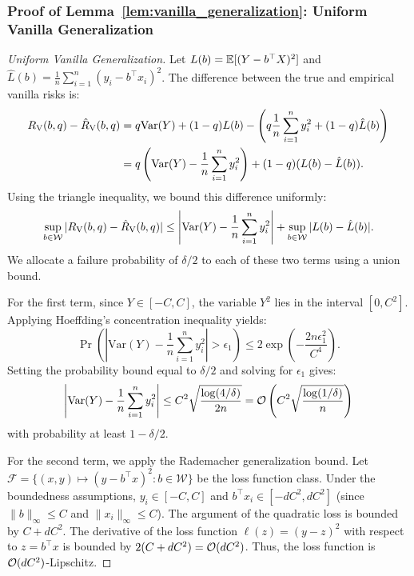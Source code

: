 \subsubsection*{Proof of Lemma~\ref{lem:vanilla_generalization}: Uniform Vanilla Generalization}
\label{app:proof_vanilla_generalization}
\begin{proof}[Uniform Vanilla Generalization]
Let $L(b) = \mathbb{E}[(Y - b^\top X)^2]$ and $\hat{L}(b) = \frac{1}{n}\sum_{i=1}^n (y_i - b^\top x_i)^2$. The difference between the true and empirical vanilla risks is:
\begin{align}
    R_{\mathrm{V}}(b, q) - \hat{R}_{\mathrm{V}}(b, q) &= q \mathrm{Var}(Y) + (1 - q)L(b) - \left( q \frac{1}{n}\sum_{i=1}^n y_i^2 + (1 - q)\hat{L}(b) \right) \nonumber \\
    &= q\left( \mathrm{Var}(Y) - \frac{1}{n}\sum_{i=1}^n y_i^2 \right) + (1 - q)(L(b) - \hat{L}(b)).
\end{align}
Using the triangle inequality, we bound this difference uniformly:
\begin{equation}
    \sup_{b \in \mathcal{W}} |R_{\mathrm{V}}(b, q) - \hat{R}_{\mathrm{V}}(b, q)| \le \left| \mathrm{Var}(Y) - \frac{1}{n}\sum_{i=1}^n y_i^2 \right| + \sup_{b \in \mathcal{W}} |L(b) - \hat{L}(b)|.
\end{equation}
We allocate a failure probability of $\delta/2$ to each of these two terms using a union bound.

For the first term, since $Y \in [-C, C]$, the variable $Y^2$ lies in the interval $[0, C^2]$. Applying Hoeffding's concentration inequality yields:
\begin{equation}
    \Pr\left( \left| \mathrm{Var}(Y) - \frac{1}{n}\sum_{i=1}^n y_i^2 \right| > \epsilon_1 \right) \le 2\exp\left( - \frac{2n \epsilon_1^2}{C^4} \right).
\end{equation}
Setting the probability bound equal to $\delta/2$ and solving for $\epsilon_1$ gives:
\begin{equation}
    \left| \mathrm{Var}(Y) - \frac{1}{n}\sum_{i=1}^n y_i^2 \right| \le C^2 \sqrt{\frac{\log(4/\delta)}{2n}} = \mathcal{O}\left( C^2 \sqrt{\frac{\log(1/\delta)}{n}} \right)
\end{equation}
with probability at least $1 - \delta/2$.

For the second term, we apply the Rademacher generalization bound. Let $\mathcal{F} = \{(x, y) \mapsto (y - b^\top x)^2 : b \in \mathcal{W}\}$ be the loss function class. Under the boundedness assumptions, $y_i \in [-C, C]$ and $b^\top x_i \in [-dC^2, dC^2]$ (since $\|b\|_\infty \le C$ and $\|x_i\|_\infty \le C$). The argument of the quadratic loss is bounded by $C + dC^2$. The derivative of the loss function $\ell(z) = (y - z)^2$ with respect to $z = b^\top x$ is bounded by $2(C + dC^2) = \mathcal{O}(dC^2)$. Thus, the loss function is $\mathcal{O}(dC^2)$-Lipschitz.


\end{proof}
